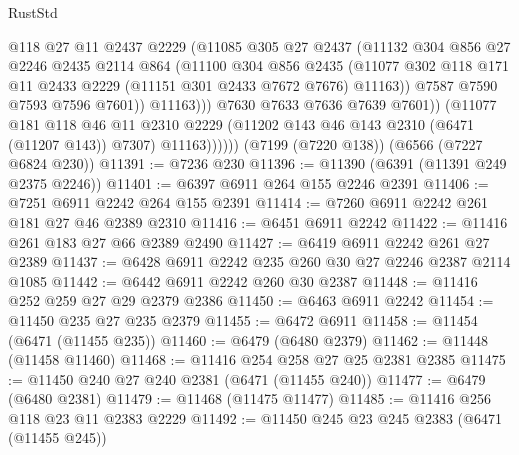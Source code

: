 \begin{lexlean}{RustStd}
\begin{coremodule}
                        @118
                        @27
                        @11
                        @2437
                        @2229
                        (@11085
                          @305
                          @27
                          @2437
                          (@11132
                            @304
                            @856
                            @27
                            @2246
                            @2435
                            @2114
                            @864
                            (@11100
                              @304
                              @856
                              @2435
                              (@11077
                                @302
                                @118
                                @171
                                @11
                                @2433
                                @2229
                                (@11151 @301 @2433 @7672 @7676)
                                @11163))
                            @7587
                            @7590
                            @7593
                            @7596
                            @7601))
                        @11163)))
                  @7630
                  @7633
                  @7636
                  @7639
                  @7601))
              (@11077
                @181
                @118
                @46
                @11
                @2310
                @2229
                (@11202 @143 @46 @143 @2310 (@6471 (@11207 @143)) @7307)
                @11163))))))
    (@7199 (@7220 @138))
    (@6566 (@7227 @6824 @230))
@11391 := @7236 @230
@11396 := @11390 (@6391 (@11391 @249 @2375 @2246))
@11401 := @6397 @6911 @264 @155 @2246 @2391
@11406 := @7251 @6911 @2242 @264 @155 @2391
@11414 := @7260 @6911 @2242 @261 @181 @27 @46 @2389 @2310
@11416 := @6451 @6911 @2242
@11422 := @11416 @261 @183 @27 @66 @2389 @2490
@11427 := @6419 @6911 @2242 @261 @27 @2389
@11437 := @6428 @6911 @2242 @235 @260 @30 @27 @2246 @2387 @2114 @1085
@11442 := @6442 @6911 @2242 @260 @30 @2387
@11448 := @11416 @252 @259 @27 @29 @2379 @2386
@11450 := @6463 @6911 @2242
@11454 := @11450 @235 @27 @235 @2379
@11455 := @6472 @6911
@11458 := @11454 (@6471 (@11455 @235))
@11460 := @6479 (@6480 @2379)
@11462 := @11448 (@11458 @11460)
@11468 := @11416 @254 @258 @27 @25 @2381 @2385
@11475 := @11450 @240 @27 @240 @2381 (@6471 (@11455 @240))
@11477 := @6479 (@6480 @2381)
@11479 := @11468 (@11475 @11477)
@11485 := @11416 @256 @118 @23 @11 @2383 @2229
@11492 := @11450 @245 @23 @245 @2383 (@6471 (@11455 @245))

\end{coremodule}
\end{lexlean}
